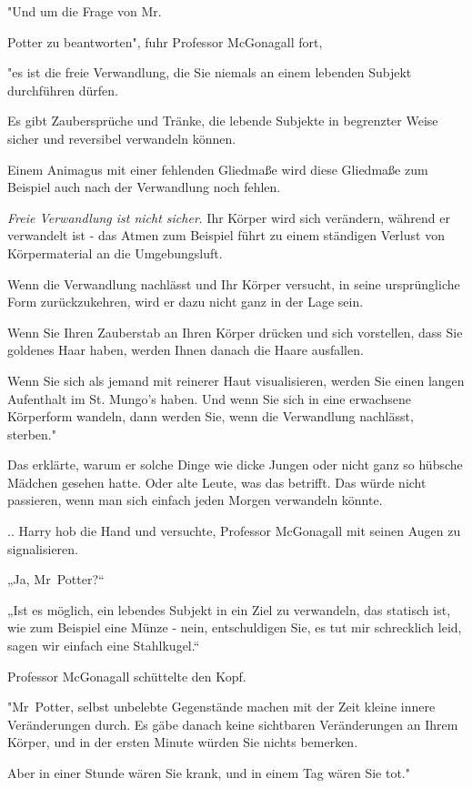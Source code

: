 {"Und um die Frage von Mr.

Potter zu beantworten", fuhr Professor McGonagall fort,

"es ist die freie Verwandlung, die Sie niemals an einem lebenden Subjekt durchführen dürfen.

Es gibt Zaubersprüche und Tränke, die lebende Subjekte in begrenzter Weise sicher und reversibel verwandeln können.

Einem Animagus mit einer fehlenden Gliedmaße wird diese Gliedmaße zum Beispiel auch nach der Verwandlung noch fehlen.

\emph{Freie Verwandlung ist nicht sicher}. Ihr Körper wird sich verändern, während er verwandelt ist - das Atmen zum Beispiel führt zu einem ständigen Verlust von Körpermaterial an die Umgebungsluft.

Wenn die Verwandlung nachlässt und Ihr Körper versucht, in seine ursprüngliche Form zurückzukehren, wird er dazu nicht ganz in der Lage sein.

Wenn Sie Ihren Zauberstab an Ihren Körper drücken und sich vorstellen, dass Sie goldenes Haar haben, werden Ihnen danach die Haare ausfallen.

Wenn Sie sich als jemand mit reinerer Haut visualisieren, werden Sie einen langen Aufenthalt im St. Mungo's haben. Und wenn Sie sich in eine erwachsene Körperform wandeln, dann werden Sie, wenn die Verwandlung nachlässt, sterben."

Das erklärte, warum er solche Dinge wie dicke Jungen oder nicht ganz so hübsche Mädchen gesehen hatte. Oder alte Leute, was das betrifft. Das würde nicht passieren, wenn man sich einfach jeden Morgen verwandeln könnte.

.. Harry hob die Hand und versuchte, Professor McGonagall mit seinen Augen zu signalisieren.

„Ja, Mr~Potter?“

„Ist es möglich, ein lebendes Subjekt in ein Ziel zu verwandeln, das statisch ist, wie zum Beispiel eine Münze - nein, entschuldigen Sie, es tut mir schrecklich leid, sagen wir einfach eine Stahlkugel.“

Professor McGonagall schüttelte den Kopf.

"Mr~Potter, selbst unbelebte Gegenstände machen mit der Zeit kleine innere Veränderungen durch. Es gäbe danach keine sichtbaren Veränderungen an Ihrem Körper, und in der ersten Minute würden Sie nichts bemerken.

Aber in einer Stunde wären Sie krank, und in einem Tag wären Sie tot."

}
